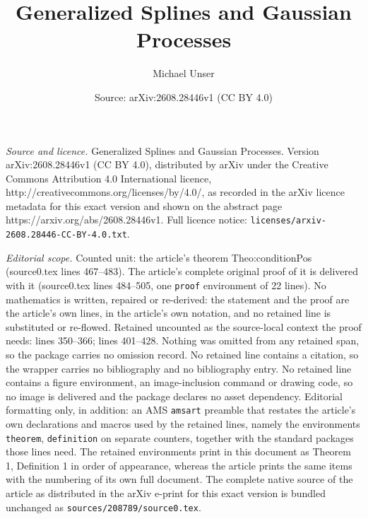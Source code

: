\documentclass[10pt,a4paper]{amsart}
\title{Generalized Splines and Gaussian Processes}
\author{Michael Unser}
\date{Source: arXiv:2608.28446v1 (CC BY 4.0)}
\begin{document}
\maketitle

\noindent\emph{Source and licence.} Generalized Splines and Gaussian Processes. Version arXiv:2608.28446v1 (CC BY 4.0), distributed by arXiv under the Creative Commons Attribution 4.0 International licence, http://creativecommons.org/licenses/by/4.0/, as recorded in the arXiv licence metadata for this exact version and shown on the abstract page https://arxiv.org/abs/2608.28446v1. Full licence notice: \texttt{licenses/arxiv-2608.28446-CC-BY-4.0.txt}.\par\smallskip

\noindent\textit{Editorial scope.} Counted unit: the article's theorem Theo:conditionPos (source0.tex lines 467--483). The article's complete original proof of it is delivered with it (source0.tex lines 484--505, one \texttt{proof} environment of 22 lines). No mathematics is written, repaired or re-derived: the statement and the proof are the article's own lines, in the article's own notation, and no retained line is substituted or re-flowed.  Retained uncounted as the source-local context the proof needs: lines 350--366; lines 401--428.  Nothing was omitted from any retained span, so the package carries no omission record.  No retained line contains a citation, so the wrapper carries no bibliography and no bibliography entry.  No retained line contains a figure environment, an image-inclusion command or drawing code, so no image is delivered and the package declares no asset dependency.  Editorial formatting only, in addition: an AMS \texttt{amsart} preamble that restates the article's own declarations and macros used by the retained lines, namely the environments \texttt{theorem}, \texttt{definition} on separate counters, together with the standard packages those lines need.  The retained environments print in this document as Theorem 1, Definition 1 in order of appearance, whereas the article prints the same items with the numbering of its own full document.  The complete native source of the article as distributed in the arXiv e-print for this exact version is bundled unchanged as \texttt{sources/208789/source0.tex}.
\end{document}
